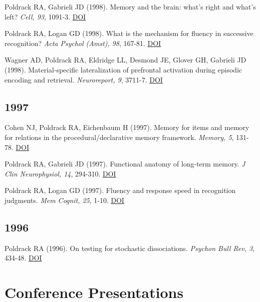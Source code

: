 \documentclass[10pt, letterpaper]{article}
\begin{document}
Poldrack RA, Gabrieli JD (1998). Memory and the brain: what's right and what's left? \textit{Cell, 93}, 1091-3. \href{http://dx.doi.org/10.1016/s0092-8674(00)81451-8}{DOI} \vspace{2mm}

Poldrack RA, Logan GD (1998). What is the mechanism for fluency in successive recognition? \textit{Acta Psychol (Amst), 98}, 167-81. \href{http://dx.doi.org/10.1016/s0001-6918(97)00041-3}{DOI} \vspace{2mm}

Wagner AD, Poldrack RA, Eldridge LL, Desmond JE, Glover GH, Gabrieli JD (1998). Material-specific lateralization of prefrontal activation during episodic encoding and retrieval. \textit{Neuroreport, 9}, 3711-7. \href{http://dx.doi.org/10.1097/00001756-199811160-00026}{DOI} \vspace{2mm}

\subsection*{1997}Cohen NJ, Poldrack RA, Eichenbaum H (1997). Memory for items and memory for relations in the procedural/declarative memory framework. \textit{Memory, 5}, 131-78. \href{http://dx.doi.org/10.1080/741941149}{DOI} \vspace{2mm}

Poldrack RA, Gabrieli JD (1997). Functional anatomy of long-term memory. \textit{J Clin Neurophysiol, 14}, 294-310. \href{http://dx.doi.org/10.1097/00004691-199707000-00003}{DOI} \vspace{2mm}

Poldrack RA, Logan GD (1997). Fluency and response speed in recognition judgments. \textit{Mem Cognit, 25}, 1-10. \href{http://dx.doi.org/10.3758/bf03197280}{DOI} \vspace{2mm}

\subsection*{1996}Poldrack RA (1996). On testing for stochastic dissociations. \textit{Psychon Bull Rev, 3}, 434-48. \href{http://dx.doi.org/10.3758/bf03214547}{DOI} \vspace{2mm}

\section*{Conference Presentations}
\noindent
\end{document}
